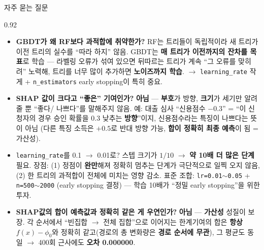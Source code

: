 \begin{frame}{자주 묻는 질문}
\begin{center}\begin{varwidth}{0.92\textwidth}
  \small
  \begin{itemize}
    \item \textbf{GBDT가 왜 RF보다 과적합에 취약한가?} RF는 트리들이
      독립적이라 새 트리가 이전 트리의 실수를 ``따라 하지'' 않음. GBDT는
      \textbf{매 트리가 이전까지의 잔차를 목표}로 학습 — 라벨링 오류가
      섞여 있으면 뒤따르는 트리가 계속 ``그 오류를 맞히려'' 노력해,
      트리를 너무 많이 추가하면 \textbf{노이즈까지 학습}.
      $\to$ \texttt{learning\_rate} 작게 + \texttt{n\_estimators}
      early stopping이 특히 중요.
    \item \textbf{SHAP 값이 크다고 ``좋은'' 기여인가?} \textbf{아님} —
      \textbf{부호}가 방향, \textbf{크기}가 세기만 알려줄 뿐 ``좋다/
      나쁘다''를 말해주지 않음. 예: 대출 심사 ``신용점수 $-0.3$'' =
      ``이 신청자의 경우 승인 확률을 0.3 낮추는 \textbf{방향}''이지,
      신용점수라는 특징이 나쁘다는 뜻이 아님 (다른 특징 소득은 $+0.5$로
      반대 방향 가능, \textbf{합이 정확히 최종 예측}이 됨 = 가산성).
    \item \texttt{learning\_rate}를 0.1 $\to$ 0.01로? 스텝 크기가
      $1/10$ $\to$ \textbf{약 10배 더 많은 단계} 필요. 장점:
      (1) 정점이 \textbf{완만}해져 정확히 멈추는 단계가 극단적으로
      일찍 오지 않음, (2) 한 트리의 과적합이 전체에 미치는 영향 감소.
      표준 조합: \texttt{lr=0.01$\sim$0.05} + \texttt{n=500$\sim$2000}
      (early stopping 결정) — 학습 10배가 ``정밀 early stopping''을 위한
      투자.
    \item \textbf{SHAP값의 합이 예측값과 정확히 같은 게 우연인가?}
      \textbf{아님} — \textbf{가산성} 성질이 보장. 각 순서에서
      ``빈집합 $\to$ 전체 집합''으로 이어지는 한계기여의 합은
      \textbf{항상} $f(x) - \phi_0$와 정확히 같고(경로의 총 변화량은
      \textbf{경로 순서에 무관}), 그 평균도 동일 $\to$ 400회 근사에도
      \textbf{오차 0.000000}.
  \end{itemize}
\end{varwidth}\end{center}
\end{frame}
